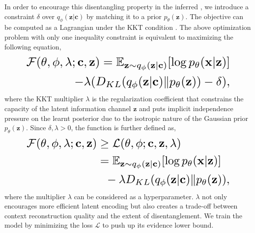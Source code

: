 \documentclass[11pt]{article}
\begin{document}
In order to encourage this disentangling property in the inferred \cite{DBLP:conf/iclr/HigginsMPBGBML17},
we introduce a constraint $\delta$ over $q_{\phi}(\mathbf{z} | \mathbf{c})$ by matching it to a prior $p_{\theta}(\mathbf{z})$.
The objective can be computed as a Lagrangian under the KKT condition \cite{bertsekas1997nonlinear,karush2014minima}.
The above optimization problem with only one inequality constraint is equivalent to maximizing the following equation,
\begin{equation}
      \resizebox{0.86\linewidth}{!}{$
\begin{split}
    \mathcal{F}(\theta, \phi, \lambda; \mathbf{c}, \mathbf{z}) = \mathbb{E}_{
    \mathbf{z} \sim q_{\phi}(\mathbf{z} | \mathbf{c})
    }[\log p_\theta (\mathbf{x} | \mathbf{z})] 
     \\ - \lambda (D_{KL}( 
            q_{\phi}(\mathbf{z} | \mathbf{c}) 
            \|
            p_{\theta}(\mathbf{z}) ) - \delta),
\end{split}
$}
\end{equation}
where the KKT multiplier $\lambda$ is the regularization coefficient that constrains the capacity of the latent information channel $\mathbf{z}$ and puts implicit independence pressure on the learnt posterior due to the isotropic nature of the Gaussian prior $p_{\theta}(\mathbf{z})$.
Since $\delta,\lambda>0$, the function is further defined as,
\begin{equation}
    \resizebox{0.86\linewidth}{!}{$
    \begin{split}
      \mathcal{F}(\theta, \phi, \lambda; \mathbf{c}, \mathbf{z})  
      &\geq \mathcal{L}(\theta, \phi; \mathbf{c}, \mathbf{z}, \lambda)  \\ 
      &= 
      \mathbb{E}_{
      \mathbf{z} \sim q_{\phi}(\mathbf{z} | \mathbf{c})
      }[\log p_\theta (\mathbf{x} | \mathbf{z})] 
    \\ & \ \ - \lambda  D_{KL}( 
            q_{\phi}(\mathbf{z} | \mathbf{c}) 
            \|
           p_{\theta}(\mathbf{z})
           ),
    \end{split}
    $}
\end{equation}
where the multiplier $\lambda$ can be considered as a hyperparameter.
$\lambda$ not only encourages more efficient latent encoding but also creates a trade-off between context reconstruction quality and the extent of disentanglement.
We train the model by minimizing the loss $\mathcal{L}$ to push up its evidence lower bound.
\end{document}
